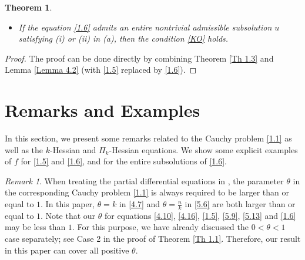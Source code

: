 \documentclass[a4paper,11pt]{amsart}
\theoremstyle{plain}
\newtheorem{Theorem}{Theorem}[section]
\theoremstyle{remark}
\newtheorem{remark}{Remark}
\numberwithin{equation}{section}
\numberwithin{figure}{section}
\numberwithin{remark}{section}
\begin{document}
\begin{sloppypar}
\begin{Theorem}
\begin{itemize}
\begin{itemize}
\item[(ii).] If $p> \alpha + \beta +2$, $(p-1)\alpha + \beta \ge 0$, then $u(x)\in C^2(\mathbb{R}^n\backslash \{0\})\cap  W_{loc}^{2,\delta}(\mathbb{R}^n)$ for $\delta \in (1, \frac{p-\beta-1}{p-\alpha-\beta-2})$.
\end{itemize}

\item[(b).] If the equation \eqref{1.6} admits an entire nontrivial admissible subsolution $u$ satisfying (i) or (ii) in (a), then the condition \eqref{KO} holds.
\end{itemize}
\end{Theorem}
\begin{proof}
The proof can be done directly by combining Theorem \ref{Th 1.3} and Lemma \ref{Lemma 4.2} (with \eqref{1.5} replaced by \eqref{1.6}).
\end{proof}





\vspace{3mm}






\section{Remarks and Examples}\label{Section 6}
In this section, we present some remarks related to the Cauchy problem \eqref{1.1} as well as the $k$-Hessian and $\Pi_k$-Hessian equations. We show some explicit examples of $f$ for \eqref{1.5} and \eqref{1.6}, and for the entire subsolutions of \eqref{1.6}.


\begin{remark}\label{Re 6.1}
When treating the partial differential equations in \cite{K1957, O1957, NU1997, JB2010, BF2022, JJL2024}, the parameter $\theta$ in the corresponding Cauchy problem \eqref{1.1} is always required to be larger than or equal to $1$. In this paper, $\theta=k$ in \eqref{4.7} and $\theta=\frac{n}{k}$ in \eqref{5.6} are both larger than or equal to $1$. Note that our $\theta$ for equations \eqref{4.10}, \eqref{4.16}, \eqref{1.5}, \eqref{5.9}, \eqref{5.13} and \eqref{1.6} may be less than $1$. For this purpose, we have already discussed the $0<\theta <1$ case separately; see Case 2 in the proof of Theorem \ref{Th 1.1}. Therefore, our result in this paper can cover all positive $\theta$.  
\end{remark}


\end{sloppypar}
\end{document}
